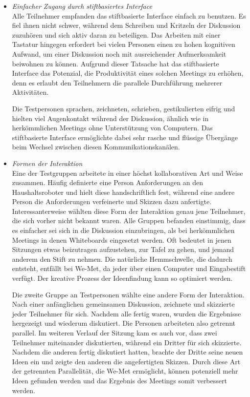 \begin{itemize}
	\item \textit{Einfacher Zugang durch stiftbasiertes Interface}\\
	Alle Teilnehmer empfanden das stiftbasierte Interface einfach zu benutzen. Es fiel ihnen nicht schwer, während dem Schreiben und Kritzeln der Diskussion zuzuhören und sich aktiv daran zu beteiligen. Das Arbeiten mit einer Tastatur hingegen erfordert bei vielen Personen einen zu hohen kognitiven Aufwand, um einer Diskussion noch mit ausreichender Aufmerksamkeit beiwohnen zu können. Aufgrund dieser Tatsache hat das stiftbasierte Interface das Potenzial, die Produktivität eines solchen Meetings zu erhöhen, denn es erlaubt den Teilnehmern die parallele Durchführung mehrerer Aktivitäten.
	
	Die Testpersonen sprachen, zeichneten, schrieben, gestikulierten eifrig und hielten viel Augenkontakt während der Diskussion, ähnlich wie in herkömmlichen Meetings ohne Unterstützung von Computern. Das stiftbasierte Interface ermöglichte dabei sehr rasche und flüssige Übergänge beim Wechsel zwischen diesen Kommunikationskanälen.
	
	\item \textit{Formen der Interaktion}\\
	Eine der Testgruppen arbeitete in einer höchst kollaborativen Art und Weise zusammen. Häufig definierte eine Person Anforderungen an den Haushaltsroboter und hielt diese handschriftlich fest, während eine andere Person die Anforderungen verfeinerte und Skizzen dazu anfertigte. Interessanterweise wählten diese Form der Interaktion genau jene Teilnehmer, die sich vorher nicht bekannt waren. Alle Gruppen befanden einstimmig, dass es einfacher sei sich in die Diskussion einzubringen, als bei herkömmlichen Meetings in denen Whiteboards eingesetzt werden. Oft bedeutet in jenen Sitzungen etwas beizutragen aufzustehen, zur Tafel zu gehen, und jemand anderem den Stift zu nehmen. Die natürliche Hemmschwelle, die dadurch entsteht, entfällt bei We-Met, da jeder über einen Computer und Eingabestift verfügt. Der kreative Prozess der Ideenfindung kann so optimiert werden.
	
	Die zweite Gruppe an Testpersonen wählte eine andere Form der Interaktion. Nach einer anfänglichen gemeinsamen Diskussion, zeichnete und skizzierte jeder Teilnehmer für sich. Nachdem alle fertig waren, wurden die Ergebnisse hergezeigt und wiederum diskutiert. Die Personen arbeiteten also getrennt parallel. Im weiteren Verlauf der Sitzung kam es auch vor, dass zwei Teilnehmer miteinander diskutierten, während ein Dritter für sich skizzierte. Nachdem die anderen fertig diskutiert hatten, brachte der Dritte seine neuen Ideen ein und zeigte den anderen die angefertigten Skizzen. Durch diese Art der getrennten Parallelität, die We-Met ermöglicht, können potenziell mehr Ideen gefunden werden und das Ergebnis des Meetings somit verbessert werden.
	

\end{itemize}
